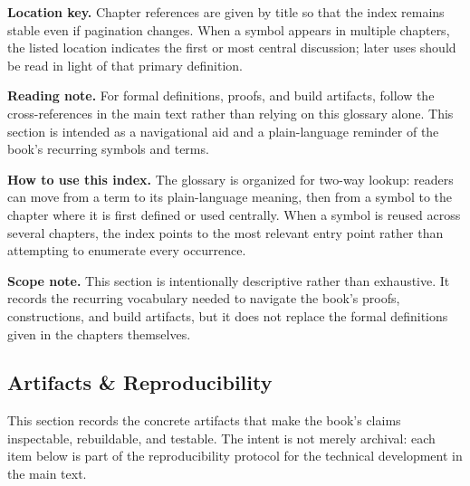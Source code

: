 \documentclass[11pt]{article}
\begin{document}
\medskip

\noindent\textbf{Location key.} Chapter references are given by title so that the index remains stable even if pagination changes. When a symbol appears in multiple chapters, the listed location indicates the first or most central discussion; later uses should be read in light of that primary definition.

\medskip

\noindent\textbf{Reading note.} For formal definitions, proofs, and build artifacts, follow the cross-references in the main text rather than relying on this glossary alone. This section is intended as a navigational aid and a plain-language reminder of the book's recurring symbols and terms.

\medskip

\noindent\textbf{How to use this index.} The glossary is organized for two-way lookup: readers can move from a term to its plain-language meaning, then from a symbol to the chapter where it is first defined or used centrally. When a symbol is reused across several chapters, the index points to the most relevant entry point rather than attempting to enumerate every occurrence.

\medskip

\noindent\textbf{Scope note.} This section is intentionally descriptive rather than exhaustive. It records the recurring vocabulary needed to navigate the book's proofs, constructions, and build artifacts, but it does not replace the formal definitions given in the chapters themselves.



\subsection{Artifacts \& Reproducibility}


This section records the concrete artifacts that make the book's claims inspectable, rebuildable, and testable. The intent is not merely archival: each item below is part of the reproducibility protocol for the technical development in the main text.
\end{document}
